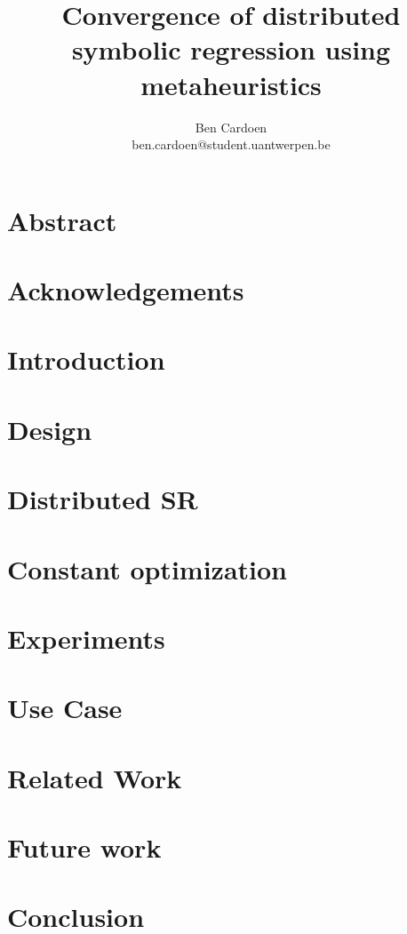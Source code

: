\documentclass[]{article}
\title{Convergence of distributed symbolic regression using metaheuristics
    }
\author{
    Ben Cardoen  \\
    ben.cardoen@student.uantwerpen.be
}
\begin{document}
    
    \maketitle
    \section{Abstract}
    
    \newpage
    
    \section{Acknowledgements}
    
    \newpage
    
    \tableofcontents
    
    \newpage
    \section{Introduction}
    
    \newpage
    \section{Design}\label{secdesign}
    
    \newpage
    \section{Distributed SR}\label{secdistributed}
    
    \newpage
    \section{Constant optimization}\label{secconstopt}
    
    \newpage
    \section{Experiments}\label{secexperiments}
    
    \newpage
    \section{Use Case}\label{secusecase}
    
    \newpage
    \section{Related Work}
    
    \newpage
	\section{Future work}
    
    \newpage
    \section{Conclusion}
    
    \newpage
	\listoffigures
	\newpage
    \listoftables
    \newpage
    
    
    
\end{document}
